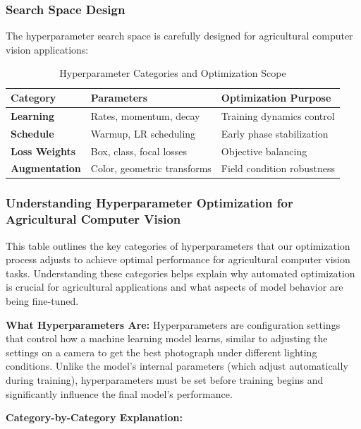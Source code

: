 \subsubsection{Search Space Design}

The hyperparameter search space is carefully designed for agricultural computer vision applications:

\begin{table}[H]
\centering
\caption{Hyperparameter Categories and Optimization Scope}
\label{tab:hyperparameters}
\begin{tabular}{@{}lp{3cm}p{7cm}@{}}
\toprule
\textbf{Category} & \textbf{Parameters} & \textbf{Optimization Purpose} \\
\midrule
\textbf{Learning} & Rates, momentum, decay & Training dynamics control \\
\textbf{Schedule} & Warmup, LR scheduling & Early phase stabilization \\
\textbf{Loss Weights} & Box, class, focal losses & Objective balancing \\
\textbf{Augmentation} & Color, geometric transforms & Field condition robustness \\
\bottomrule
\end{tabular}
\end{table}

\subsubsection{Understanding Hyperparameter Optimization for Agricultural Computer Vision}

This table outlines the key categories of hyperparameters that our optimization process adjusts to achieve optimal performance for agricultural computer vision tasks. Understanding these categories helps explain why automated optimization is crucial for agricultural applications and what aspects of model behavior are being fine-tuned.

\textbf{What Hyperparameters Are:} Hyperparameters are configuration settings that control how a machine learning model learns, similar to adjusting the settings on a camera to get the best photograph under different lighting conditions. Unlike the model's internal parameters (which adjust automatically during training), hyperparameters must be set before training begins and significantly influence the final model's performance.

\textbf{Category-by-Category Explanation:}

